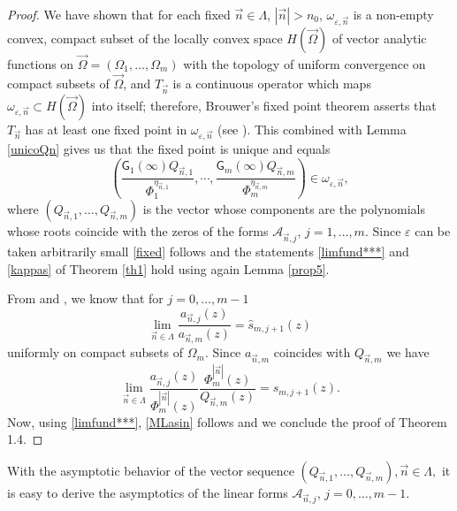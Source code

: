 \documentclass{amsart}
\numberwithin{equation}{section}
\theoremstyle{definition}
\newcommand{\n}{\vec{n}}          %
\begin{document}
\begin{proof}
 We have shown that for each fixed $\n \in \Lambda$, $|\n| > n_0$, $\omega_{\varepsilon,\n}$ is a non-empty convex, compact subset of
 the locally convex space $H(\vec{\Omega})$ of vector analytic functions on $\vec{\Omega} = (\Omega_1, \ldots,\Omega_m)$ with the topology of uniform convergence on compact subsets of $\vec{\Omega}$, and $T_{\n}$ is a continuous operator which maps $\omega_{\varepsilon,\n} \subset H(\vec{\Omega})$ into itself; therefore, Brouwer's fixed point theorem asserts that  $T_{\n}$ has at least one fixed point in $\omega_{\varepsilon,\n}$ (see \cite[Theorem V.19]{ReedSimon}). This combined with Lemma \ref{unicoQn} gives us that the   fixed point is unique and  equals
 \[
   \left(\frac{\mathsf{G}_1(\infty)Q_{\n,1}}{\Phi_1^{\eta_{\n,1}}},\cdots,
   \frac{\mathsf{G}_m(\infty)Q_{\n,m}}{\Phi_m^{\eta_{\n,m}}}\right) \in \omega_{\varepsilon,\n},
 \]
 where  $(Q_{\n,1},\ldots,Q_{\n,m})$ is the vector  whose components  are the polynomials whose roots coincide with the zeros of the forms $\mathcal{A}_{\n,j}$, $j=1,\ldots,m$. Since $\varepsilon$ can be taken arbitrarily small \eqref{fixed} follows and the statements \eqref{limfund***} and \eqref{kappas} of Theorem \ref{th1} hold using again Lemma \ref{prop5}.

 From \cite[Prop. 1.2]{lysov20} and \cite[Th 1.1]{SLL22}, we know that for $j=0,\ldots,m-1$
\[
  \lim_{\n\in\Lambda} \frac{a_{\n,j}(z)}{a_{\n,m}(z)} = \widehat{s}_{m,j+1}(z)
\]
uniformly on compact subsets of $\Omega_m$. Since $a_{\n,m}$ coincides with $Q_{\n,m}$ we have
\[
  \lim_{\n\in\Lambda} \frac{a_{\n,j}(z)}{\Phi_m^{|\n|}(z)}\frac{\Phi_m^{|\n|}(z)}{Q_{\n,m}(z)} =\widehat{s}_{m,j+1}(z).
\]
Now, using  \eqref{limfund***},  \eqref{MLasin} follows and we conclude the proof of Theorem 1.4. \end{proof}

With the asymptotic behavior of the vector sequence $(Q_{\n,1},\ldots,Q_{\n,m}), \n \in \Lambda,$ it is easy to derive the asymptotics of the linear forms $\mathcal{A}_{\n,j}$, $j=0,\ldots,m-1$.
\end{document}
